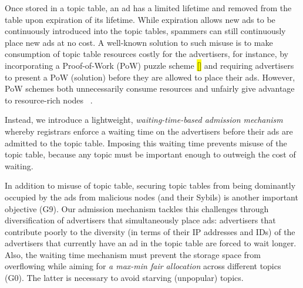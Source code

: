 Once stored in a topic table, an ad has a limited lifetime and removed from the table upon expiration of its lifetime. While expiration allows new ads to be continuously introduced into the topic tables, spammers can still continuously place new ads at no cost. A well-known solution to such misuse is to make consumption of topic table resources costly for the advertisers, for instance, by incorporating a Proof-of-Work (PoW) puzzle scheme \hl{[]} and requiring advertisers to present a PoW (\ie solution) before they are allowed to place their ads. However, PoW schemes both unnecessarily consume resources and unfairly give advantage to resource-rich nodes ~\cite{gervais2014bitcoin}. 



Instead, we introduce a lightweight, \textit{waiting-time-based admission mechanism} whereby registrars enforce a waiting time on the advertisers before their ads are admitted to the topic table. Imposing this waiting time prevents misuse of the topic table, because any topic must be important enough to outweigh the cost of waiting. 

In addition to misuse of topic table, securing topic tables from being dominantly occupied by the ads from malicious nodes (and their Sybils) is another important objective (G9). Our admission mechanism tackles this challenges through diversification of advertisers that simultaneously place ads: advertisers that contribute poorly to the diversity (in terms of their IP addresses and IDs) of the advertisers that currently have an ad in the topic table are forced to wait longer. Also, the waiting time mechanism must prevent the storage space from overflowing while aiming for \textit{a max-min fair allocation} across different topics (G0). The latter is necessary to avoid starving (unpopular) topics. %

